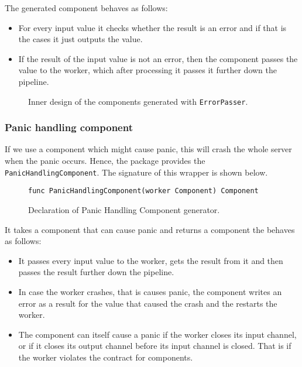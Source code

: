 The generated component behaves as follows:
\begin{itemize}
	\item For every input value it checks whether the result is an error
		  and if that is the cases it just outputs the value.
	\item If the result of the input value is not an error, then the component
		  passes the value to the worker, which after processing it passes 
		  it further down the pipeline.
\end{itemize}

\begin{figure}[h]
\centering
{}
\caption[scale=1.0]{Inner design of the components generated with
  \texttt{ErrorPasser}.}
\label{fig:errPasserDiag}
\end{figure}

\subsubsection{Panic handling component}
If we use a component which might cause panic, this will crash the whole
server when the panic occurs. Hence, the package provides the 
\texttt{PanicHandlingComponent}. The signature of this wrapper is shown 
below.
\begin{figure}[h]
\centering
\begin{lstlisting}
func PanicHandlingComponent(worker Component) Component
\end{lstlisting}
\caption[scale=1.0]{Declaration of Panic Handling Component generator.}
\label{fig:panicHandler}
\end{figure}

It takes a component that can cause panic and returns a component the 
behaves as follows:
\begin{itemize}
	\item It passes every input value to the worker, gets the result 
          from it and then passes the result further down the pipeline.
	\item In case the worker crashes, that is causes panic, the component 
          writes an error as a result for the value that caused the crash 
          and the restarts the worker.
	\item The component can itself cause a panic if the worker closes its 
          input channel, or if it closes its output channel before its input 
          channel is closed. That is if the worker violates the contract
          for components.
\end{itemize}

